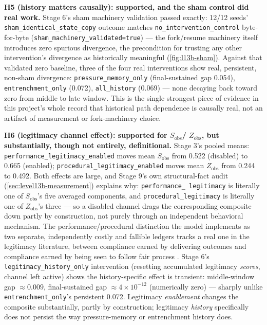 \textbf{H5 (history matters causally): supported, and the sham control did
real work.} Stage 6's sham machinery validation passed exactly: 12/12
seeds' \texttt{sham\_identical\_state\_copy} outcome matches
\texttt{no\_intervention\_control} byte-for-byte
(\texttt{sham\_machinery\_validated=true}) --- the fork/resume machinery
itself introduces zero spurious divergence, the precondition for trusting
any other intervention's divergence as historically meaningful
(\cref{fig:l13b-sham}). Against that validated zero baseline, three of the
four real interventions show real, persistent, non-sham divergence:
\texttt{pressure\_memory\_only} (final-sustained gap 0.054),
\texttt{entrenchment\_only} (0.072), \texttt{all\_history} (0.069) --- none
decaying back toward zero from middle to late window. This is the single
strongest piece of evidence in this project's whole record that historical
path dependence is causally real, not an artifact of measurement or
fork-machinery choice.

\textbf{H6 (legitimacy channel effect): supported for $S_{\text{obs}}$/%
$Z_{\text{obs}}$, but substantially, though not entirely, definitional.}
Stage 3's pooled means: \texttt{performance\_legitimacy\_enabled} moves mean
$S_{\text{obs}}$ from 0.522 (disabled) to 0.665 (enabled);
\texttt{procedural\_legitimacy\_enabled} moves mean $Z_{\text{obs}}$ from
0.244 to 0.492. Both effects are large, and Stage 9's own structural-fact
audit (\cref{sec:level13b-measurement}) explains why: \texttt{performance\_%
legitimacy} is literally one of $S_{\text{obs}}$'s five averaged
components, and \texttt{procedural\_legitimacy} is literally one of
$Z_{\text{obs}}$'s three --- so a disabled channel drags the corresponding
composite down partly by construction, not purely through an independent
behavioral mechanism. The performance/procedural distinction the model
implements as two separate, independently costly and fallible ledgers
tracks a real one in the legitimacy literature, between compliance earned
by delivering outcomes and compliance earned by being seen to follow fair
process \parencite{levi1988ruleandrevenue}.
Stage 6's \texttt{legitimacy\_history\_only} intervention (resetting
accumulated legitimacy \textit{scores}, channel left active) shows the
history-specific effect is transient: middle-window gap $\approx0.009$,
final-sustained gap $\approx4\times10^{-12}$ (numerically zero) --- sharply
unlike \texttt{entrenchment\_only}'s persistent 0.072. Legitimacy
\textit{enablement} changes the composite substantially, partly by
construction; legitimacy \textit{history} specifically does not persist
the way pressure-memory or entrenchment history does.

